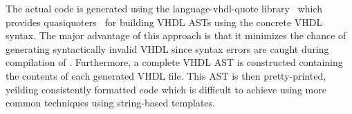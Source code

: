 The actual code is generated using the {\ttfamily language-vhdl-quote}
library~\cite{language-vhdl-quote} which provides
quasiquoters~\cite{mainland2007s} for building VHDL ASTs using the concrete VHDL
syntax. The major advantage of this approach is that it minimizes the chance of
generating syntactically invalid VHDL since syntax errors are caught during
compilation of \libsme{}. Furthermore, a complete VHDL AST is constructed
containing the contents of each generated VHDL file. This AST is then
pretty-printed, yeilding consistently formatted code which is difficult to
achieve using more common techniques using string-based templates.


